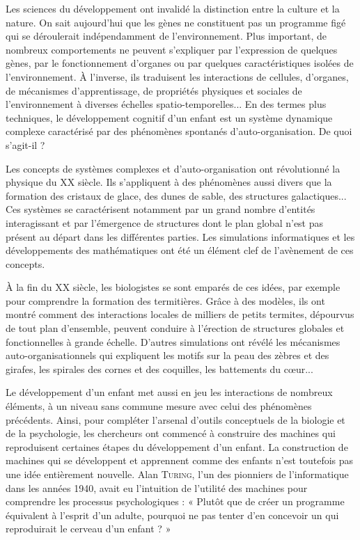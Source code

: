 Les sciences du développement ont invalidé la distinction entre la culture et la nature. On sait aujourd’hui que les gènes ne constituent pas un programme figé qui se déroulerait indépendamment de l’environnement.
Plus important, de nombreux comportements ne peuvent s’expliquer par l’expression de quelques gènes, par le fonctionnement d’organes ou par quelques caractéristiques isolées de l’environnement. À l’inverse, ils traduisent les interactions de cellules, d’organes, de mécanismes d’apprentissage, de propriétés physiques et sociales de l’environnement à diverses échelles spatio-temporelles... En des termes plus techniques, le développement cognitif d’un enfant est un système dynamique complexe caractérisé par des phénomènes spontanés d’auto-organisation. De quoi s’agit-il ?


Les concepts de systèmes complexes et d’auto-organisation ont révolutionné la physique du XX siècle. Ils s’appliquent à des phénomènes aussi divers que la formation des cristaux de glace, des dunes de sable, des structures galactiques... Ces systèmes se caractérisent notamment par un grand nombre d’entités interagissant et par l’émergence de structures dont le plan global n’est pas présent au départ dans les différentes parties. Les simulations informatiques et les développements des mathématiques ont été un élément clef de l’avènement de ces concepts.

À la fin du XX siècle, les biologistes se sont emparés de ces idées, par exemple pour comprendre la formation des termitières. Grâce à des modèles, ils ont montré comment des interactions locales de milliers de petits termites, dépourvus de tout plan d’ensemble, peuvent conduire à l’érection de structures globales et fonctionnelles à grande échelle. D’autres simulations ont révélé les mécanismes auto-organisa\-tionnels qui expliquent les motifs sur la peau des zèbres et des girafes, les spirales des cornes et des coquilles, les battements du cœur...

Le développement d’un enfant met aussi en jeu les interactions de nombreux éléments, à un niveau sans commune mesure avec celui des phénomènes précédents. Ainsi, pour compléter l’arsenal d’outils conceptuels de la biologie et de la psychologie, les chercheurs ont commencé à construire des machines qui reproduisent certaines éta\-pes du développement d’un enfant.
La construction de machines qui se développent et apprennent comme des enfants n’est toutefois pas une idée entièrement nouvelle. Alan \textsc{Turing}, l’un des pionniers de l’informatique dans les années 1940, avait eu l’intuition de l’utilité des machines pour comprendre les processus psychologiques : « Plutôt que de créer un programme équivalent à l’esprit d’un adulte, pourquoi ne pas tenter d’en concevoir un qui reproduirait le cerveau d’un enfant ? »

